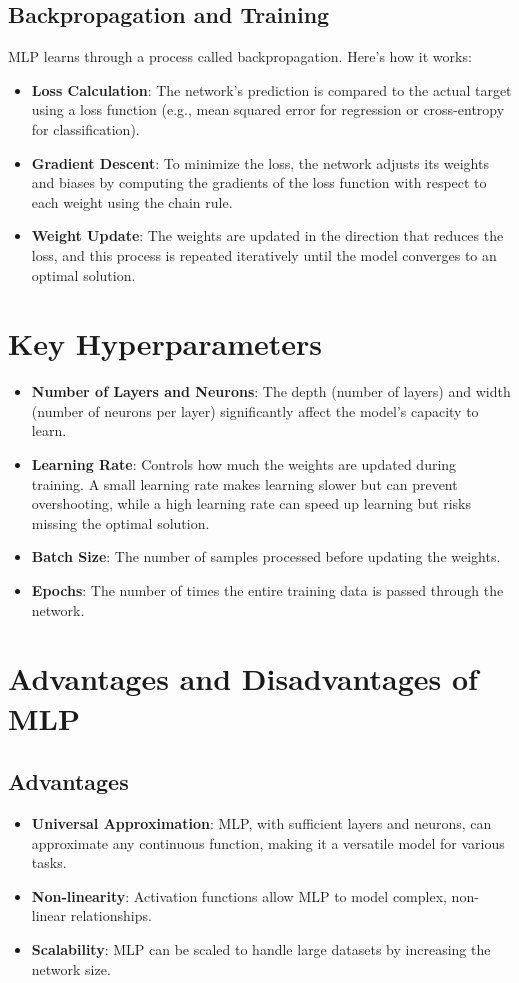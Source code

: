 \documentclass{article}
\begin{document}
	\subsection{Backpropagation and Training}
	MLP learns through a process called backpropagation. Here's how it works:
	\begin{itemize}
		\item \textbf{Loss Calculation}: The network's prediction is compared to the actual target using a loss function (e.g., mean squared error for regression or cross-entropy for classification).
		\item \textbf{Gradient Descent}: To minimize the loss, the network adjusts its weights and biases by computing the gradients of the loss function with respect to each weight using the chain rule.
		\item \textbf{Weight Update}: The weights are updated in the direction that reduces the loss, and this process is repeated iteratively until the model converges to an optimal solution.
	\end{itemize}
	
	\section{Key Hyperparameters}
	\begin{itemize}
		\item \textbf{Number of Layers and Neurons}: The depth (number of layers) and width (number of neurons per layer) significantly affect the model's capacity to learn.
		\item \textbf{Learning Rate}: Controls how much the weights are updated during training. A small learning rate makes learning slower but can prevent overshooting, while a high learning rate can speed up learning but risks missing the optimal solution.
		\item \textbf{Batch Size}: The number of samples processed before updating the weights.
		\item \textbf{Epochs}: The number of times the entire training data is passed through the network.
	\end{itemize}
	
	\section{Advantages and Disadvantages of MLP}
	
	\subsection{Advantages}
	\begin{itemize}
		\item \textbf{Universal Approximation}: MLP, with sufficient layers and neurons, can approximate any continuous function, making it a versatile model for various tasks.
		\item \textbf{Non-linearity}: Activation functions allow MLP to model complex, non-linear relationships.
		\item \textbf{Scalability}: MLP can be scaled to handle large datasets by increasing the network size.
	\end{itemize}
	
\end{document}
